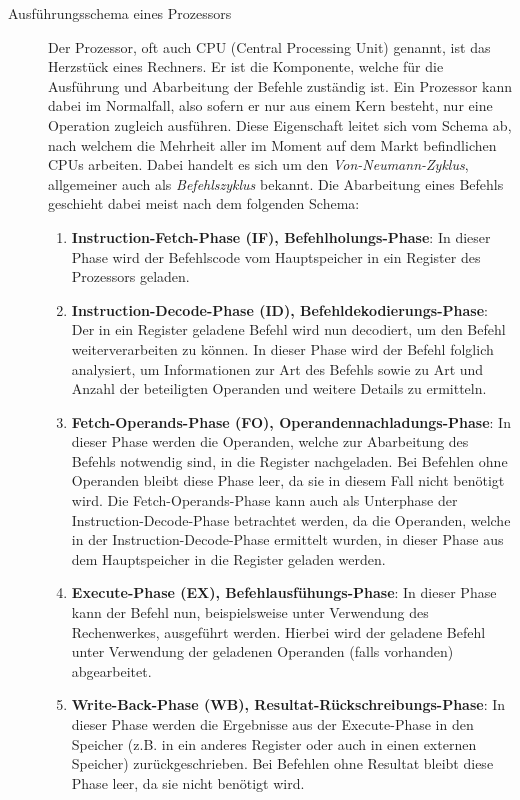 				\begin{description}
			  		\item[Ausführungsschema eines Prozessors]
						Der Prozessor, oft auch CPU (Central Processing Unit) genannt, ist das Herzstück eines Rechners. Er ist die Komponente, welche für die Ausführung und Abarbeitung der Befehle zuständig ist. Ein Prozessor kann dabei im Normalfall, also sofern er nur aus einem Kern besteht, nur eine Operation zugleich ausführen. Diese Eigenschaft leitet sich vom Schema ab, nach welchem die Mehrheit aller im Moment auf dem Markt befindlichen CPUs arbeiten. Dabei handelt es sich um den \textit{Von-Neumann-Zyklus}, allgemeiner auch als \textit{Befehlszyklus} bekannt.
						Die Abarbeitung eines Befehls geschieht dabei meist nach dem folgenden Schema:
						
						\begin{enumerate}
							\item \textbf{Instruction-Fetch-Phase (IF), Befehlholungs-Phase}: In dieser Phase wird der Befehlscode vom Hauptspeicher in ein Register des Prozessors geladen.
							\item \textbf{Instruction-Decode-Phase (ID), Befehldekodierungs-Phase}: Der in ein Register geladene Befehl wird nun decodiert, um den Befehl weiterverarbeiten zu können. In dieser Phase wird der Befehl folglich analysiert, um Informationen zur Art des Befehls sowie zu Art und Anzahl der beteiligten Operanden und weitere Details zu ermitteln.
							\item \textbf{Fetch-Operands-Phase (FO), Operandennachladungs-Phase}: In dieser Phase werden die Operanden, welche zur Abarbeitung des Befehls notwendig sind, in die Register nachgeladen. Bei Befehlen ohne Operanden bleibt diese Phase leer, da sie in diesem Fall nicht benötigt wird. Die Fetch-Operands-Phase kann auch als Unterphase der Instruction-Decode-Phase betrachtet werden, da die Operanden, welche in der Instruction-Decode-Phase ermittelt wurden, in dieser Phase aus dem Hauptspeicher in die Register geladen werden.
							\item \textbf{Execute-Phase (EX), Befehlausfühungs-Phase}: In dieser Phase kann der Befehl nun, beispielsweise unter Verwendung des Rechenwerkes, ausgeführt werden. Hierbei wird der geladene Befehl unter Verwendung der geladenen Operanden (falls vorhanden) abgearbeitet.
							\item \textbf{Write-Back-Phase (WB), Resultat-Rückschreibungs-Phase}: In dieser Phase werden die Ergebnisse aus der Execute-Phase in den Speicher (z.B. in ein anderes Register oder auch in einen externen Speicher) zurückgeschrieben. Bei Befehlen ohne Resultat bleibt diese Phase leer, da sie nicht benötigt wird.
						\end{enumerate}
						

\end{description}
